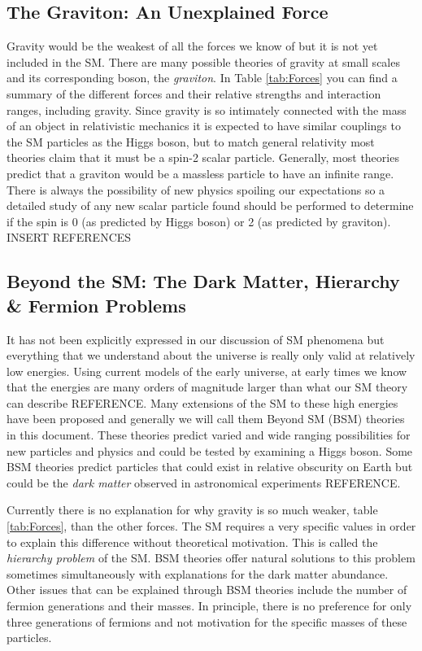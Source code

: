 \subsection{The Graviton: An Unexplained Force}
\label{sec:Graviton}

Gravity would be the weakest of all the forces we know of but it is not yet included in the SM. There are many possible theories of gravity at small scales and its corresponding boson, the \textit{graviton}. In Table \ref{tab:Forces} you can find a summary of the different forces and their relative strengths and interaction ranges, including gravity. Since gravity is so intimately connected with the mass of an object in relativistic mechanics it is expected to have similar couplings to the SM particles as the Higgs boson, but to match general relativity most theories claim that it must be a spin-2 scalar particle. Generally, most theories predict that a graviton would be a massless particle to have an infinite range. There is always the possibility of new physics spoiling our expectations so a detailed study of any new scalar particle found should be performed to determine if the spin is 0 (as predicted by Higgs boson) or 2 (as predicted by graviton). INSERT REFERENCES


\subsection{Beyond the SM: The Dark Matter, Hierarchy \& Fermion Problems}
\label{sec:BSM}

It has not been explicitly expressed in our discussion of SM phenomena but everything that we understand about the universe is really only valid at relatively low energies. Using current models of the early universe, at early times we know that the energies are many orders of magnitude larger than what our SM theory can describe REFERENCE. Many extensions of the SM to these high energies have been proposed and generally we will call them Beyond SM (BSM) theories in this document. These theories predict varied and wide ranging possibilities for new particles and physics and could be tested by examining a Higgs boson. Some BSM theories predict particles that could exist in relative obscurity on Earth but could be the \textit{dark matter} observed in astronomical experiments REFERENCE. 

Currently there is no explanation for why gravity is so much weaker, table \ref{tab:Forces}, than the other forces. The SM requires a very specific values in order to explain this difference without theoretical motivation. This is called the \textit{hierarchy problem} of the SM.  BSM theories offer natural solutions to this problem sometimes simultaneously with explanations for the dark matter abundance. Other issues that can be explained through BSM theories include the number of fermion generations and their masses. In principle, there is no preference for only three generations of fermions and not motivation for the specific masses of these particles. 

